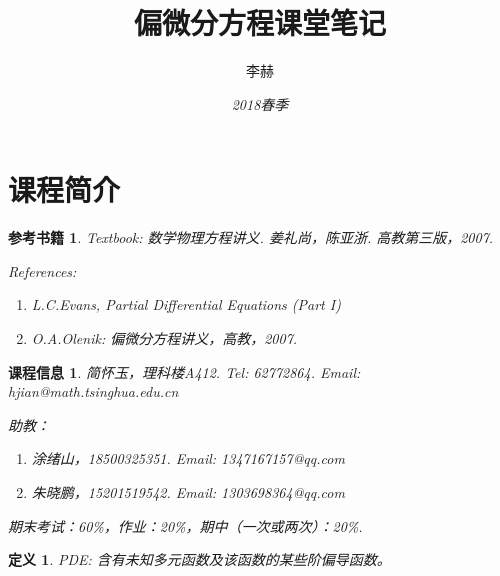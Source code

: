 \documentclass[11pt, a4paper]{article}
\theoremstyle{theorem}
\newtheorem{definition}[thm]{定义}
\newtheorem*{refer}{参考书籍}
\newtheorem*{CI}{课程信息}
\begin{document}
\title{偏微分方程课堂笔记}
\date{\emph{2018春季}}
\author{李赫}
\maketitle

\tableofcontents

\newpage

\section{课程简介}

\begin{refer}
Textbook: 数学物理方程讲义. 姜礼尚，陈亚浙. 高教第三版，2007.

References:
\begin{enumerate}[(1)]
    \item L.C.Evans, Partial Differential Equations (Part I)
    \item O.A.Olenik: 偏微分方程讲义，高教，2007.
\end{enumerate}
\end{refer}

\begin{CI}
简怀玉，理科楼A412. Tel: 62772864. Email: \emph{hjian@math.tsinghua.edu.cn}

助教：
\begin{enumerate}[(1)]
    \item 涂绪山，18500325351. Email: \emph{1347167157@qq.com}
    \item 朱晓鹏，15201519542. Email: \emph{1303698364@qq.com}
\end{enumerate}

期末考试：60\%，作业：20\%，期中（一次或两次）：20\%.
\end{CI}

\begin{definition}
PDE: 含有未知多元函数及该函数的某些阶偏导函数。
\end{definition}
\end{document}
